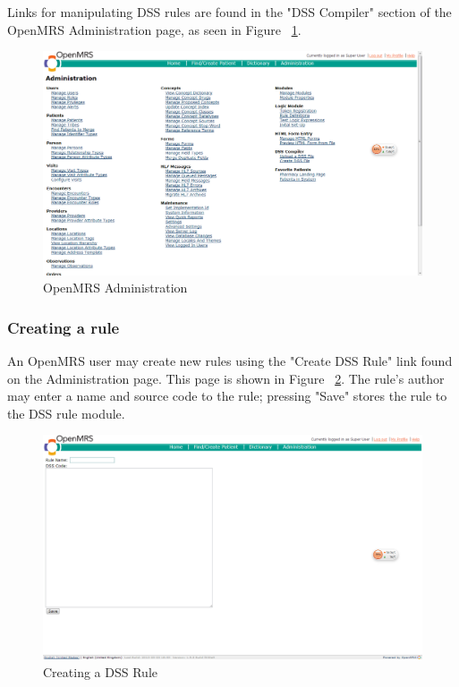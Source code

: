 \documentclass[12pt,letterpaper]{article}
\begin{document}
Links for manipulating DSS rules are found in the "DSS Compiler" 
section of the OpenMRS Administration page, as seen in Figure 
~\ref{fig:ADMINISTRATION}.

\begin{figure}\begin{center}
\includegraphics[width=6.5in]{administration.png}
\end{center}
\caption{OpenMRS Administration} \label{fig:ADMINISTRATION}
\end{figure}

\subsubsection{Creating a rule}

An OpenMRS user may create new rules using the "Create DSS Rule" 
link found on the Administration page. This page is shown in 
Figure ~\ref{fig:CREATE_DSS_PROGRAM}. The rule's author may 
enter a name and source code to the rule; pressing "Save" stores 
the rule to the DSS rule module.

\begin{figure}\begin{center}
\includegraphics[width=6.5in]{createDSSProgram.png}
\end{center}
\caption{Creating a DSS Rule} \label{fig:CREATE_DSS_PROGRAM}
\end{figure}
\end{document}
